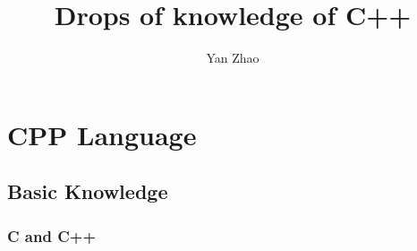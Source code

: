 \documentclass[a4paper,12pt,twoside]{book}
\begin{document}
\title{Drops of knowledge of C++}
\author{Yan Zhao}
\date{}\maketitle

\setcounter{secnumdepth}{4}
\setcounter{tocdepth}{4}
\tableofcontents
\chapter{CPP Language}

\section{Basic Knowledge}
\subsection{C and C++}
\end{document}
